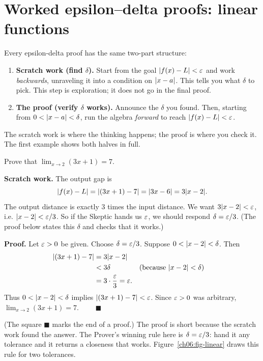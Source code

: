 \section{Worked epsilon--delta proofs: linear functions}
\label{ch06:linear}

Every epsilon-delta proof has the same two-part structure:

\begin{enumerate}
\item \textbf{Scratch work (find $\delta$).} Start from the goal
  $\lvert f(x)-L\rvert<\varepsilon$ and work \emph{backwards}, unraveling it into a condition
  on $\lvert x-a\rvert$. This tells you what $\delta$ to pick. This step is
  exploration; it does not go in the final proof.
\item \textbf{The proof (verify $\delta$ works).} Announce the $\delta$ you
  found. Then, starting from $0<\lvert x-a\rvert<\delta$, run the algebra
  \emph{forward} to reach $\lvert f(x)-L\rvert<\varepsilon$.
\end{enumerate}

The scratch work is where the thinking happens; the proof is where you check it.
The first example shows both halves in full.

\begin{example}
\label{ch06:ex-linear}
Prove that $\displaystyle \lim_{x\to 2}(3x+1) = 7$.
\end{example}

\textbf{Scratch work.} The output gap is
\[
  \lvert f(x) - L\rvert = \lvert(3x+1) - 7\rvert = \lvert3x - 6\rvert = 3\lvert x-2\rvert.
\]
The output distance is exactly $3$ times the input distance. We want
$3\lvert x-2\rvert < \varepsilon$, i.e. $\lvert x-2\rvert < \varepsilon/3$. So if the Skeptic hands us
$\varepsilon$, we should respond $\delta = \varepsilon/3$. (The proof below states this
$\delta$ and checks that it works.)

\textbf{Proof.} Let $\varepsilon > 0$ be given. Choose $\delta = \varepsilon/3$. Suppose
$0 < \lvert x-2\rvert < \delta$. Then
\begin{align*}
  \lvert(3x+1) - 7\rvert &= 3\lvert x-2\rvert \\
  &< 3\delta && \text{(because } \lvert x-2\rvert<\delta\text{)} \\
  &= 3\cdot\frac{\varepsilon}{3} = \varepsilon.
\end{align*}
Thus $0<\lvert x-2\rvert<\delta$ implies $\lvert(3x+1)-7\rvert<\varepsilon$. Since $\varepsilon>0$ was
arbitrary, $\lim_{x\to 2}(3x+1) = 7$. $\qquad\blacksquare$

(The square $\blacksquare$ marks the end of a proof.) The proof is short because
the scratch work found the answer. The Prover's winning rule here is
$\delta = \varepsilon/3$: hand it any tolerance and it returns a closeness that works.
Figure~\ref{ch06:fig-linear} draws this rule for two tolerances.

